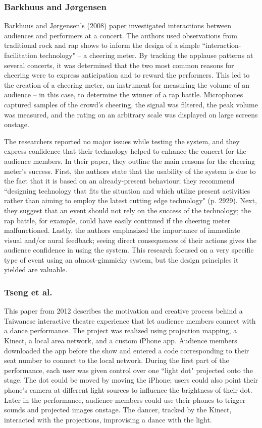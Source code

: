 \subsubsection{Barkhuus and J{\o}rgensen}

Barkhuus and J{\o}rgensen's (2008) paper investigated interactions between audiences and performers at a concert. The authors used observations from traditional rock and rap shows to inform the design of a simple ``interaction-facilitation technology" -- a cheering meter. By tracking the applause patterns at several concerts, it was determined that the two most common reasons for cheering were to express anticipation and to reward the performers. This led to the creation of a cheering meter, an instrument for measuring the volume of an audience -- in this case, to determine the winner of a rap battle. Microphones captured samples of the crowd's cheering, the signal was filtered, the peak volume was measured, and the rating on an arbitrary scale was displayed on large screens onstage.

The researchers reported no major issues while testing the system, and they express confidence that their technology helped to enhance the concert for the audience members. In their paper, they outline the main reasons for the cheering meter's success. First, the authors state that the usability of the system is due to the fact that it is based on an already-present behaviour; they recommend ``designing technology that fits the situation and which utilize present activities rather than aiming to employ the latest cutting edge technology" (p. 2929). Next, they suggest that an event should not rely on the success of the technology; the rap battle, for example, could have easily continued if the cheering meter malfunctioned. Lastly, the authors emphasized the importance of immediate visual and/or aural feedback; seeing direct consequences of their actions gives the audience confidence in using the system. This research focused on a very specific type of event using an almost-gimmicky system, but the design principles it yielded are valuable.

\subsubsection{Tseng et al.}

This paper from 2012 describes the motivation and creative process behind a Taiwanese interactive theatre experience that let audience members connect with a dance performance. The project was realized using projection mapping, a Kinect, a local area network, and a custom iPhone app. Audience members downloaded the app before the show and entered a code corresponding to their seat number to connect to the local network. During the first part of the performance, each user was given control over one ``light dot" projected onto the stage. The dot could be moved by moving the iPhone; users could also point their phone's camera at different light sources to influence the brightness of their dot. Later in the performance, audience members could use their phones to trigger sounds and projected images onstage. The dancer, tracked by the Kinect, interacted with the projections, improvising a dance with the light.

